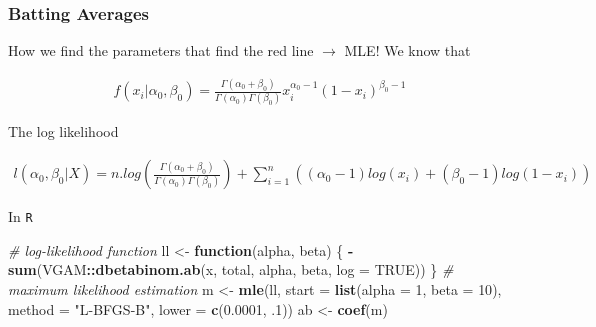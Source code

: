 \documentclass[
  shownotes,
  xcolor={svgnames},
  hyperref={colorlinks,citecolor=DarkBlue,linkcolor=DarkRed,urlcolor=DarkBlue}
  ]{beamer}
\newenvironment{Shaded}{\begin{snugshade}}{\end{snugshade}}
\newcommand{\CommentTok}[1]{\textcolor[rgb]{0.56,0.35,0.01}{\textit{#1}}}
\newcommand{\ControlFlowTok}[1]{\textcolor[rgb]{0.13,0.29,0.53}{\textbf{#1}}}
\newcommand{\DataTypeTok}[1]{\textcolor[rgb]{0.13,0.29,0.53}{#1}}
\newcommand{\DecValTok}[1]{\textcolor[rgb]{0.00,0.00,0.81}{#1}}
\newcommand{\FloatTok}[1]{\textcolor[rgb]{0.00,0.00,0.81}{#1}}
\newcommand{\KeywordTok}[1]{\textcolor[rgb]{0.13,0.29,0.53}{\textbf{#1}}}
\newcommand{\NormalTok}[1]{#1}
\newcommand{\OperatorTok}[1]{\textcolor[rgb]{0.81,0.36,0.00}{\textbf{#1}}}
\newcommand{\OtherTok}[1]{\textcolor[rgb]{0.56,0.35,0.01}{#1}}
\newcommand{\StringTok}[1]{\textcolor[rgb]{0.31,0.60,0.02}{#1}}
\begin{document}
\begin{frame}[fragile]
\frametitle{Batting Averages}
How we find the parameters that find the red line $\rightarrow$ MLE! We know that

\begin{align}
f(x_i|\alpha_0,\beta_0)=\frac{\Gamma(\alpha_0+\beta_0)}{\Gamma(\alpha_0)\Gamma(\beta_0)}x_i^{\alpha_0-1}\left(1-x_i\right)^{\beta_0-1}
\end{align}

The log likelihood 
\begin{footnotesize}
\begin{align}
l(\alpha_0,\beta_0|X) = n . log(\frac{\Gamma(\alpha_0+\beta_0)}{\Gamma(\alpha_0)\Gamma(\beta_0)}) + \sum_{i=1}^n ((\alpha_0-1)log(x_i)+(\beta_0-1)log(1-x_i))
\end{align}
\end{footnotesize}


In \texttt{R}
\footnotesize
\begin{Shaded}
\begin{Highlighting}[]
\CommentTok{\# log{-}likelihood function}
\NormalTok{ll \textless{}{-}}\StringTok{ }\ControlFlowTok{function}\NormalTok{(alpha, beta) \{}
\OperatorTok{{-}}\KeywordTok{sum}\NormalTok{(VGAM}\OperatorTok{::}\KeywordTok{dbetabinom.ab}\NormalTok{(x, total, alpha, beta, }\DataTypeTok{log =} \OtherTok{TRUE}\NormalTok{))}
\NormalTok{\}}
\CommentTok{\# maximum likelihood estimation}
\NormalTok{m \textless{}{-}}\StringTok{ }\KeywordTok{mle}\NormalTok{(ll, }\DataTypeTok{start =} \KeywordTok{list}\NormalTok{(}\DataTypeTok{alpha =} \DecValTok{1}\NormalTok{, }\DataTypeTok{beta =} \DecValTok{10}\NormalTok{), }
\DataTypeTok{method =} \StringTok{"L{-}BFGS{-}B"}\NormalTok{, }\DataTypeTok{lower =} \KeywordTok{c}\NormalTok{(}\FloatTok{0.0001}\NormalTok{, }\FloatTok{.1}\NormalTok{))}
\NormalTok{ab \textless{}{-}}\StringTok{ }\KeywordTok{coef}\NormalTok{(m) }
\end{Highlighting}
\end{Shaded}


\end{frame}
\end{document}
